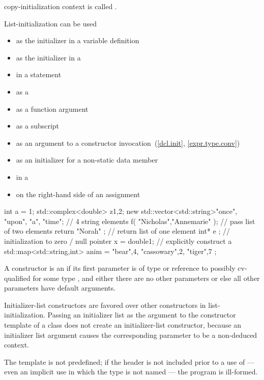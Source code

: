 copy-initialization context is called . \begin{note}
List-initialization can be used

\begin{itemize}
\item as the initializer in a variable definition
\item as the initializer in a 
\item in a  statement
\item as a 
\item as a function argument
\item as a subscript
\item as an argument to a constructor invocation~(\ref{dcl.init}, \ref{expr.type.conv})
\item as an initializer for a non-static data member
\item in a 
\item on the right-hand side of an assignment
\end{itemize}

\begin{example}
\begin{codeblock}
int a = {1};
std::complex<double> z{1,2};
new std::vector<std::string>{"once", "upon", "a", "time"};  // 4 string elements
f( {"Nicholas","Annemarie"} );  // pass list of two elements
return { "Norah" };             // return list of one element
int* e {};                      // initialization to zero / null pointer
x = double{1};                  // explicitly construct a 
std::map<std::string,int> anim = { {"bear",4}, {"cassowary",2}, {"tiger",7} };
\end{codeblock}
\end{example} \end{note}

\pnum
A constructor is an  if its first parameter is
of type  or reference to possibly cv-qualified
 for some type , and either there are no other
parameters or else all other parameters have default arguments.
\begin{note} Initializer-list constructors are favored over other constructors in
list-initialization. Passing an initializer list as the argument
to the constructor template  of a class  does not
create an initializer-list constructor, because an initializer list argument causes the
corresponding parameter to be a non-deduced context. \end{note}
The template
 is not predefined; if the header
 is not included prior to a use of
 --- even an implicit use in which the type is not
named --- the program is ill-formed.

